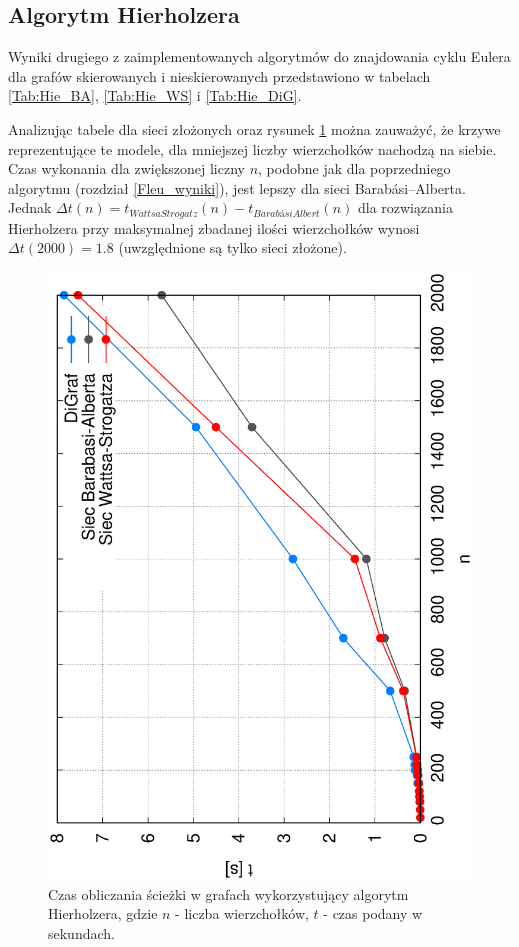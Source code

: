 \documentclass[a4paper, 12pt, twoside, openright]{article}
\begin{document}
\subsection{Algorytm Hierholzera}\par\indent


	Wyniki drugiego z zaimplementowanych algorytmów do znajdowania cyklu Eulera dla grafów skierowanych i nieskierowanych przedstawiono w tabelach \ref{Tab:Hie_BA}, \ref{Tab:Hie_WS} i \ref{Tab:Hie_DiG}.

	Analizując tabele dla sieci złożonych oraz rysunek \ref{hie_n} można zauważyć, że krzywe reprezentujące te modele, dla mniejszej liczby wierzchołków nachodzą na siebie. Czas wykonania dla zwiększonej liczny $n$, podobne jak dla poprzedniego algorytmu (rozdział \ref{Fleu_wyniki}), jest lepszy dla sieci Barabási–Alberta. Jednak $\Delta t(n) = t_{WattsaStrogatz}(n) - t_{BarabásiAlbert}(n)$ dla rozwiązania Hierholzera przy maksymalnej zbadanej ilości wierzchołków wynosi $\Delta t(2000) = 1.8$ (uwzględnione są tylko sieci złożone).
	
\begin{figure}[h]
	\centering
	\includegraphics[angle=270,width=1\textwidth]{img/wyniki/Hierholzer_n}
	\caption[]{Czas obliczania ścieżki w grafach wykorzystujący algorytm Hierholzera, gdzie $n$ - liczba wierzchołków, $t$ - czas podany w sekundach.}
	\label{hie_n}
\end{figure}
\end{document}
